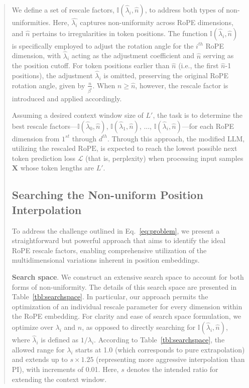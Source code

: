 \begin{abstract}
We define a set of rescale factors, $\mathbb{I}(\hat{\lambda}_{i},\hat{n})$, to address both types of non-uniformities. Here, $\hat{\lambda_i}$ captures non-uniformity across RoPE dimensions, and $\hat{n}$ pertains to irregularities in token positions. The function $\mathbb{I}(\hat{\lambda}_{i},\hat{n})$ is specifically employed to adjust the rotation angle for the $i^{th}$ RoPE dimension, with $\hat\lambda_{i}$ acting as the adjustment coefficient and $\hat{n}$ serving as the position cutoff. For token positions earlier than $\hat{n}$ (i.e., the first $\hat{n}$-1 positions), the adjustment $\hat\lambda_{i}$ is omitted, preserving the original RoPE rotation angle, given by $\frac{n}{\beta^i}$. When $n\ge\hat{n}$, however, the rescale factor is introduced and applied accordingly.

Assuming a desired context window size of $L'$, the task is to determine the best rescale factors—$\mathbb{I}(\hat{\lambda}_{0},\hat{n})$, $\mathbb{I}(\hat{\lambda}_{1},\hat{n})$, ..., $\mathbb{I}(\hat{\lambda}_{i},\hat{n})$—for each RoPE dimension from $1^{st}$ through $d^{th}$. Through this approach, the modified $\text{LLM}$, utilizing the rescaled $\text{RoPE}$, is expected to reach the lowest possible next token prediction loss $\mathcal{L}$ (that is, perplexity) when processing input samples $\mathbf{X}$ whose token lengths are $L'$.

\subsection{Searching the Non-uniform Position Interpolation}

To address the challenge outlined in Eq.~\ref{eq:problem}, we present a straightforward but powerful approach that aims to identify the ideal RoPE rescale factors, enabling comprehensive utilization of the multidimensional variations inherent in position embeddings.

\textbf{Search space}. We construct an extensive search space to account for both forms of non-uniformity. The details of this search space are presented in Table~\ref{tbl:searchspace}. In particular, our approach permits the optimization of an individual rescale parameter for every dimension within the RoPE embedding. For clarity and ease of search space formulation, we optimize over $\lambda_i$ and $\hat{n}$, as opposed to directly searching for $\mathbb{I}(\hat{\lambda}_{i},\hat{n})$, where $\hat{\lambda}_{i}$ is defined as $1/\lambda_i$. According to Table~\ref{tbl:searchspace}, the allowed range for $\lambda_i$ starts at 1.0 (which corresponds to pure extrapolation) and extends up to $s\times1.25$ (representing more aggressive interpolation than PI), with increments of 0.01. Here, $s$ denotes the intended ratio for extending the context window.


\end{abstract}
